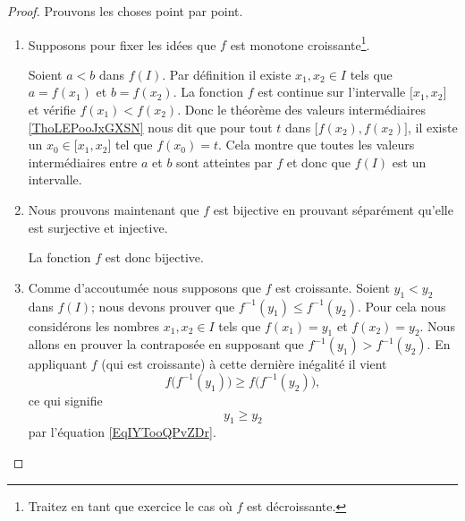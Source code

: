 \begin{proof}

    Prouvons les choses point par point. 

    \begin{enumerate}
    \item

        Supposons pour fixer les idées que \( f\) est monotone croissante\footnote{Traitez en tant que exercice le cas où \( f\) est décroissante.}.
        
        Soient \( a< b\) dans \( f(I)\). Par définition il existe \( x_1,x_2\in I\) tels que \( a=f(x_1)\) et \( b=f(x_2)\). La fonction \( f\) est continue sur l'intervalle \( \mathopen[ x_1 , x_2 \mathclose]\) et vérifie \( f(x_1)<f(x_2)\). Donc le théorème des valeurs intermédiaires \ref{ThoLEPooJxGXSN} nous dit que pour tout \( t\) dans \( \mathopen[ f(x_2) , f(x_2) \mathclose]\), il existe un \( x_0\in\mathopen[ x_1 , x_2 \mathclose]\) tel que \( f(x_0)=t\). Cela montre que toutes les valeurs intermédiaires entre \( a\) et \( b\) sont atteintes par \( f\) et donc que \( f(I)\) est un intervalle.

    \item

    Nous prouvons maintenant que \( f\) est bijective en prouvant séparément qu'elle est surjective et injective.

    La fonction \( f\) est donc bijective.

\item

    Comme d'accoutumée nous supposons que \( f\) est croissante. Soient \( y_1<y_2\) dans \( f(I)\); nous devons prouver que \( f^{-1}(y_1)\leq f^{-1}(y_2)\). Pour cela nous considérons les nombres \( x_1,x_2\in I\) tels que \( f(x_1)=y_1\) et \( f(x_2)=y_2\). Nous allons en prouver la contraposée en supposant que \( f^{-1}(y_1)>f^{-1}(y_2)\). En appliquant \( f\) (qui est croissante) à cette dernière inégalité il vient
    \begin{equation}
        f\big( f^{-1}(y_1) \big)\geq f\big( f^{-1}(y_2) \big),
    \end{equation}
    ce qui signifie
    \begin{equation}
        y_1\geq y_2
    \end{equation}
    par l'équation \eqref{EqIYTooQPvZDr}.


\end{enumerate}
\end{proof}
